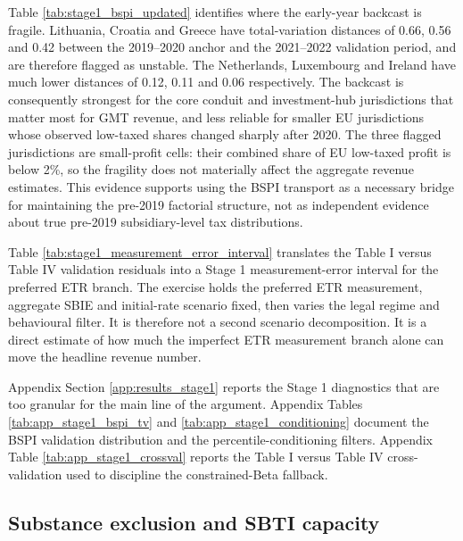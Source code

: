 \documentclass[11pt,a4paper]{article}
\begin{document}


Table \ref{tab:stage1_bspi_updated} identifies where the early-year backcast is fragile. Lithuania, Croatia and Greece have total-variation distances of 0.66, 0.56 and 0.42 between the 2019--2020 anchor and the 2021--2022 validation period, and are therefore flagged as unstable. The Netherlands, Luxembourg and Ireland have much lower distances of 0.12, 0.11 and 0.06 respectively. The backcast is consequently strongest for the core conduit and investment-hub jurisdictions that matter most for GMT revenue, and less reliable for smaller EU jurisdictions whose observed low-taxed shares changed sharply after 2020. The three flagged jurisdictions are small-profit cells: their combined share of EU low-taxed profit is below 2\%, so the fragility does not materially affect the aggregate revenue estimates. This evidence supports using the BSPI transport as a necessary bridge for maintaining the pre-2019 factorial structure, not as independent evidence about true pre-2019 subsidiary-level tax distributions.



Table \ref{tab:stage1_measurement_error_interval} translates the Table I versus Table IV validation residuals into a Stage 1 measurement-error interval for the preferred ETR branch. The exercise holds the preferred ETR measurement, aggregate SBIE and initial-rate scenario fixed, then varies the legal regime and behavioural filter. It is therefore not a second scenario decomposition. It is a direct estimate of how much the imperfect ETR measurement branch alone can move the headline revenue number.

Appendix Section \ref{app:results_stage1} reports the Stage 1 diagnostics that are too granular for the main line of the argument. Appendix Tables \ref{tab:app_stage1_bspi_tv} and \ref{tab:app_stage1_conditioning} document the BSPI validation distribution and the percentile-conditioning filters. Appendix Table \ref{tab:app_stage1_crossval} reports the Table I versus Table IV cross-validation used to discipline the constrained-Beta fallback.

\subsection{Substance exclusion and SBTI capacity}\label{sec:results_stage2}
\end{document}
